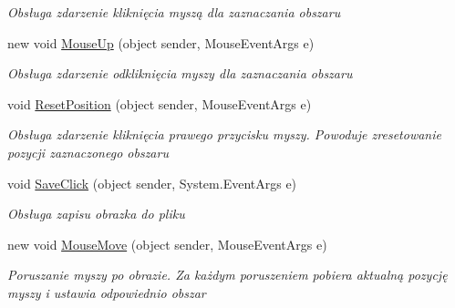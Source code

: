 \begin{DoxyCompactItemize}
\begin{DoxyCompactList}\small\item\em Obsługa zdarzenie kliknięcia myszą dla zaznaczania obszaru \end{DoxyCompactList}\item 
new void \mbox{\hyperlink{class_grafika_proj_1_1_main_window_a6cab0f4d9982cfdf44b131ccb21d7138}{Mouse\+Up}} (object sender, Mouse\+Event\+Args e)
\begin{DoxyCompactList}\small\item\em Obsługa zdarzenie odkliknięcia myszy dla zaznaczania obszaru \end{DoxyCompactList}\item 
void \mbox{\hyperlink{class_grafika_proj_1_1_main_window_a73bef7d10440a963f0e15a972dcbe941}{Reset\+Position}} (object sender, Mouse\+Event\+Args e)
\begin{DoxyCompactList}\small\item\em Obsługa zdarzenie kliknięcia prawego przycisku myszy. Powoduje zresetowanie pozycji zaznaczonego obszaru \end{DoxyCompactList}\item 
void \mbox{\hyperlink{class_grafika_proj_1_1_main_window_a204574e641ee3b1b06fcfbb3be4aca90}{Save\+Click}} (object sender, System.\+Event\+Args e)
\begin{DoxyCompactList}\small\item\em Obsługa zapisu obrazka do pliku \end{DoxyCompactList}\item 
new void \mbox{\hyperlink{class_grafika_proj_1_1_main_window_a5b445a8533469df91eb5d3cc963a447d}{Mouse\+Move}} (object sender, Mouse\+Event\+Args e)
\begin{DoxyCompactList}\small\item\em Poruszanie myszy po obrazie. Za każdym poruszeniem pobiera aktualną pozycję myszy i ustawia odpowiednio obszar \end{DoxyCompactList}\end{DoxyCompactItemize}
